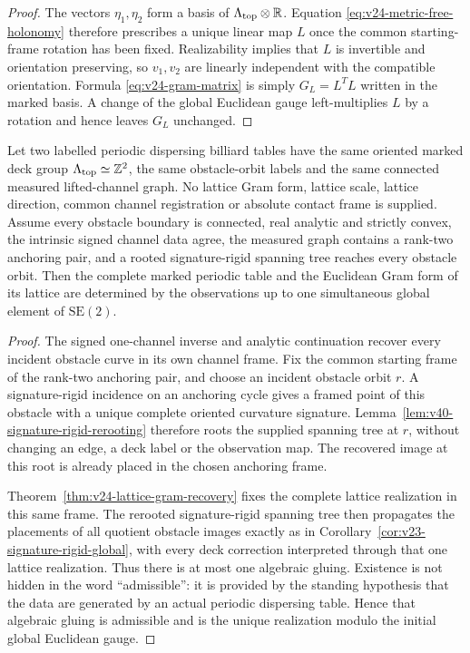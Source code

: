 \begin{proof}
The vectors \(\eta_1,\eta_2\) form a basis of
\(\Lambda_{\rm top}\otimes\mathbb R\).  Equation
\eqref{eq:v24-metric-free-holonomy} therefore prescribes a unique linear map
\(L\) once the common starting-frame rotation has been fixed.  Realizability
implies that \(L\) is invertible and orientation preserving, so
\(v_1,v_2\) are linearly independent with the compatible orientation.
Formula \eqref{eq:v24-gram-matrix} is simply
\(G_L=L^TL\) written in the marked basis.  A change of the global Euclidean
gauge left-multiplies \(L\) by a rotation and hence leaves \(G_L\) unchanged.
\end{proof}

\begin{theorem}
\label{thm:v24-uncalibrated-periodic-rigidity}
Let two labelled periodic dispersing billiard tables have the same oriented
marked deck group \(\Lambda_{\rm top}\simeq\mathbb Z^2\), the same
obstacle-orbit labels and the same connected measured lifted-channel graph.
No lattice Gram form, lattice scale, lattice direction, common channel
registration or absolute contact frame is supplied.  Assume every obstacle
boundary is connected, real analytic and strictly convex, the intrinsic signed
channel data agree, the measured graph contains a rank-two anchoring pair, and
a rooted signature-rigid spanning tree reaches every obstacle orbit.
Then the complete marked periodic table and the Euclidean Gram form of its
lattice are determined by the observations up to one simultaneous global
element of \(\mathrm{SE}(2)\).
\end{theorem}

\begin{proof}
The signed one-channel inverse and analytic continuation recover every
incident obstacle curve in its own channel frame.  Fix the common starting
frame of the rank-two anchoring pair, and choose an incident obstacle orbit
\(r\).  A signature-rigid incidence on an anchoring cycle gives a framed
point of this obstacle with a unique complete oriented curvature signature.
Lemma~\ref{lem:v40-signature-rigid-rerooting} therefore roots the supplied
spanning tree at \(r\), without changing an edge, a deck label or the
observation map.  The recovered image at this root is already placed in the
chosen anchoring frame.

Theorem~\ref{thm:v24-lattice-gram-recovery} fixes the complete lattice
realization in this same frame.  The rerooted signature-rigid spanning tree
then propagates the placements of all quotient obstacle images exactly as
in Corollary~\ref{cor:v23-signature-rigid-global}, with every deck correction
interpreted through that one lattice realization.  Thus there is at most one
algebraic gluing.  Existence is not hidden in the word ``admissible'': it is
provided by the standing hypothesis that the data are generated by an actual
periodic dispersing table.  Hence that algebraic gluing is admissible and is
the unique realization modulo the initial global Euclidean gauge.
\end{proof}

